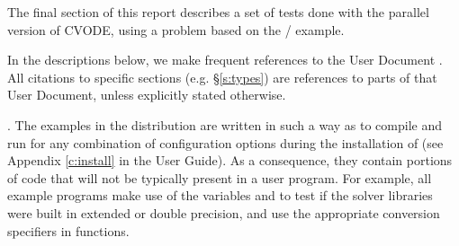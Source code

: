 The final section of this report describes a set of tests done with the
parallel version of CVODE, using a problem based on the
/ example.

In the descriptions below, we make frequent references to the {\cvode}
User Document \cite{cvode_ug}.  All citations to specific sections
(e.g. \S\ref{s:types}) are references to parts of that User Document, unless
explicitly stated otherwise.

\vspace{0.2in}.
The examples in the {\cvode} distribution are written in such a way as
to compile and run for any combination of configuration options during
the installation of {\sundials} (see Appendix \ref{c:install} in the User Guide).
As a consequence, they contain portions of code that will not be typically present
in a user program. For example, all {\CC} example programs make use of the
variables  and 
to test if the solver libraries were built in extended or double precision,
and use the appropriate conversion specifiers in  functions.
